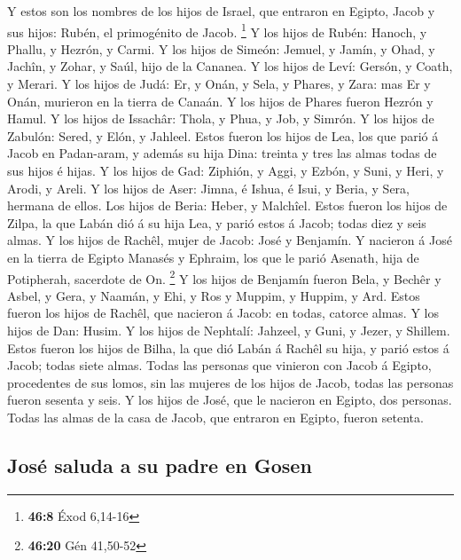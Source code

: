  Y estos son los nombres de los hijos de Israel, que
entraron en Egipto, Jacob y sus hijos: Rubén, el primogénito de Jacob.
\footnote{\textbf{46:8} Éxod 6,14-16}  Y los hijos de Rubén:
Hanoch, y Phallu, y Hezrón, y Carmi.  Y los hijos de
Simeón: Jemuel, y Jamín, y Ohad, y Jachîn, y Zohar, y Saúl, hijo de la
Cananea.  Y los hijos de Leví: Gersón, y Coath, y Merari.
 Y los hijos de Judá: Er, y Onán, y Sela, y Phares, y Zara:
mas Er y Onán, murieron en la tierra de Canaán. Y los hijos de Phares
fueron Hezrón y Hamul.  Y los hijos de Issachâr: Thola, y
Phua, y Job, y Simrón.  Y los hijos de Zabulón: Sered, y
Elón, y Jahleel.  Estos fueron los hijos de Lea, los que
parió á Jacob en Padan-aram, y además su hija Dina: treinta y tres las
almas todas de sus hijos é hijas.  Y los hijos de Gad:
Ziphión, y Aggi, y Ezbón, y Suni, y Heri, y Arodi, y Areli.
 Y los hijos de Aser: Jimna, é Ishua, é Isui, y Beria, y
Sera, hermana de ellos. Los hijos de Beria: Heber, y Malchîel.
 Estos fueron los hijos de Zilpa, la que Labán dió á su
hija Lea, y parió estos á Jacob; todas diez y seis almas. 
Y los hijos de Rachêl, mujer de Jacob: José y Benjamín.  Y
nacieron á José en la tierra de Egipto Manasés y Ephraim, los que le
parió Asenath, hija de Potipherah, sacerdote de On. \footnote{\textbf{46:20}
  Gén 41,50-52}  Y los hijos de Benjamín fueron Bela, y
Bechêr y Asbel, y Gera, y Naamán, y Ehi, y Ros y Muppim, y Huppim, y
Ard.  Estos fueron los hijos de Rachêl, que nacieron á
Jacob: en todas, catorce almas.  Y los hijos de Dan: Husim.
 Y los hijos de Nephtalí: Jahzeel, y Guni, y Jezer, y
Shillem.  Estos fueron los hijos de Bilha, la que dió Labán
á Rachêl su hija, y parió estos á Jacob; todas siete almas.
 Todas las personas que vinieron con Jacob á Egipto,
procedentes de sus lomos, sin las mujeres de los hijos de Jacob, todas
las personas fueron sesenta y seis.  Y los hijos de José,
que le nacieron en Egipto, dos personas. Todas las almas de la casa de
Jacob, que entraron en Egipto, fueron setenta.

\hypertarget{josuxe9-saluda-a-su-padre-en-gosen}{%
\subsection{José saluda a su padre en
Gosen}\label{josuxe9-saluda-a-su-padre-en-gosen}}

